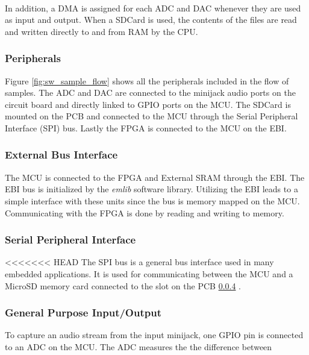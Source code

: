 \paragraph*{}
In addition, a DMA is assigned for each ADC and DAC whenever they are used as
input and output. When a SDCard is used, the contents of the files are read and
written directly to and from RAM by the CPU.

\subsubsection{Peripherals}



Figure \ref{fig:sw_sample_flow} shows all the peripherals included in the flow of samples.
The ADC and DAC are connected to the minijack audio ports on the circuit board and directly
linked to GPIO ports on the MCU. The SDCard
is mounted on the PCB and connected to the MCU through the Serial Peripheral Interface (SPI)
bus. Lastly the FPGA is connected to the MCU on the EBI.

\subsubsection{External Bus Interface}
The MCU is connected to the FPGA and External SRAM through the EBI. The EBI bus
is initialized by the {\it emlib} software library. Utilizing
the EBI leads to a simple interface with these units since the bus is memory
mapped on the MCU. Communicating with the FPGA is done by reading and writing to memory.

\subsubsection{Serial Peripheral Interface}
<<<<<<< HEAD
The SPI bus is a general bus interface used in many embedded applications. It is used
for communicating between the MCU and a MicroSD memory card connected to the slot
on the PCB \ref{} .

\subsubsection{General Purpose Input/Output}
To capture an audio stream from the input minijack, one GPIO pin is connected to an
ADC on the MCU. The ADC measures the the difference between


